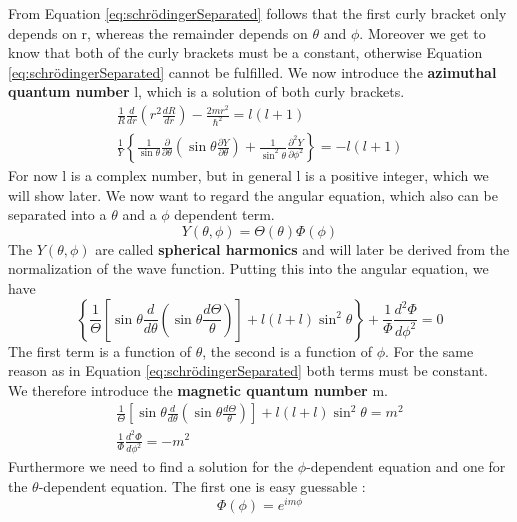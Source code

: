 			From Equation \ref{eq:schrödingerSeparated} follows that the first curly bracket only depends on r, whereas the remainder depends on $\theta$ and $\phi$. Moreover we get to know that both of the curly brackets must be a constant, otherwise Equation \ref{eq:schrödingerSeparated} cannot be fulfilled. We now introduce the \textbf{azimuthal quantum number} l, which is a solution of both curly brackets. 
			\begin{align}
				\label{eq:radialEquation}
				\frac{1}{R} \frac{d}{d r} \left(r^2 \frac{d R}{dr} \right) - \frac{2mr^2}{\hbar^2} = l(l+1) \\
				\frac{1}{Y} \left\{ \frac{1}{\sin \theta} \frac{\partial}{\partial \theta} \left( \sin \theta \frac{\partial Y}{\partial \theta} \right) + \frac{1}{\sin^2 \theta} \frac{\partial^2 Y}{\partial \phi^2} \right\} = -l(l+1)
			\end{align}
			For now l is a complex number, but in general l is a positive integer, which we will show later. We now want to regard the angular equation, which also can be separated into a $\theta$ and a $\phi$ dependent term.
			\begin{equation}
				Y(\theta, \phi) = \Theta (\theta) \Phi (\phi)
			\end{equation}
			The $Y(\theta, \phi)$ are called \textbf{spherical harmonics} and will later be derived from the normalization of the wave function. Putting this into the angular equation, we have
			\begin{equation}
				\left\{ \frac{1}{\Theta}  \left[ \sin \theta \frac{d}{d \theta} \left( \sin \theta \frac{d \Theta}{\theta} \right)\right] + l(l+l) \sin^2 \theta \right\} + \frac{1}{\Phi} \frac{d^2 \Phi}{d \phi^2} = 0
			\end{equation}
			The first term is a function of $\theta$, the second is a function of $\phi$. For the same reason as in Equation \ref{eq:schrödingerSeparated} both terms must be constant. We therefore introduce the \textbf{magnetic quantum number} m.
			\begin{align}
				\frac{1}{\Theta}  \left[ \sin \theta \frac{d}{d \theta} \left( \sin \theta \frac{d \Theta}{\theta} \right)\right] + l(l+l) \sin^2 \theta = m^2 \\
				\frac{1}{\Phi} \frac{d^2 \Phi}{d \phi^2} = -m^2
			\end{align}
			Furthermore we need to find a solution for the $\phi$-dependent equation and one for the $\theta$-dependent equation.
			The first one is easy guessable :
			\begin{equation}
				\Phi (\phi) = e^{im\phi}
			\end{equation}
